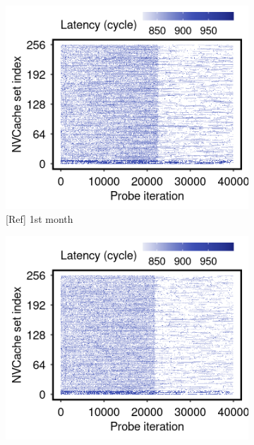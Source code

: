 
\begin{figure}[t]
    \centering
    \begin{subfigure}[b]{.24\linewidth}
        \centering
        \includegraphics[width=\linewidth]{figure/plot/reference/fig13-side-sql-range-month1.png}
        \caption{[Ref] 1st month}
        \label{fig:13:ref:side-channel-sqlite-month1}
    \end{subfigure}
    \hfill
    \begin{subfigure}[b]{.24\linewidth}
        \centering
        \includegraphics[width=\linewidth]{figure/plot/reference/fig13-side-sql-range-month2.png}

\end{subfigure}
\end{figure}
